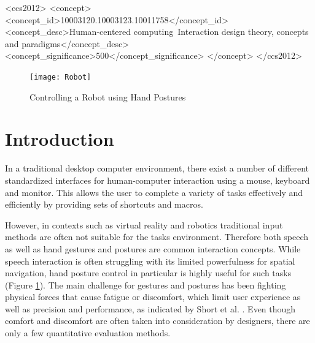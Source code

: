 \documentclass{sig-alternate-05-2015}
\begin{document}
%
%
\begin{CCSXML}
<ccs2012>
<concept>
<concept_id>10003120.10003123.10011758</concept_id>
<concept_desc>Human-centered computing~Interaction design theory, concepts and paradigms</concept_desc>
<concept_significance>500</concept_significance>
</concept>
</ccs2012>
\end{CCSXML}



\begin{figure}
\centering
\texttt{[image: Robot]}
\vspace{-20pt}
\caption{Controlling a Robot using Hand Postures}
\label{fig:Robot}
\vspace{-5pt}
\end{figure}

%
%

%
%
\printccsdesc



\section{Introduction}

In a traditional desktop computer environment, there exist a number of different standardized interfaces for human-computer interaction using a mouse, keyboard and monitor. This allows the user to 
complete a variety of tasks effectively and efficiently by providing sets of shortcuts and macros. 

However, in contexts such as virtual reality and robotics traditional input methods are often not suitable for the tasks environment. Therefore both speech as well as hand gestures and postures are common interaction concepts. While speech interaction is often struggling with its limited powerfulness for spatial navigation, hand posture control in particular is highly useful for such tasks (Figure \ref{fig:Robot}). The main challenge for gestures and postures has been fighting physical forces that cause fatigue or discomfort, which limit user experience as well as precision and performance, as indicated by Short et al. \cite{short1999precision}. Even though comfort and discomfort are often taken into consideration by designers, there are only a few quantitative evaluation methods\cite{naddeo2015proposal}.
\end{document}
